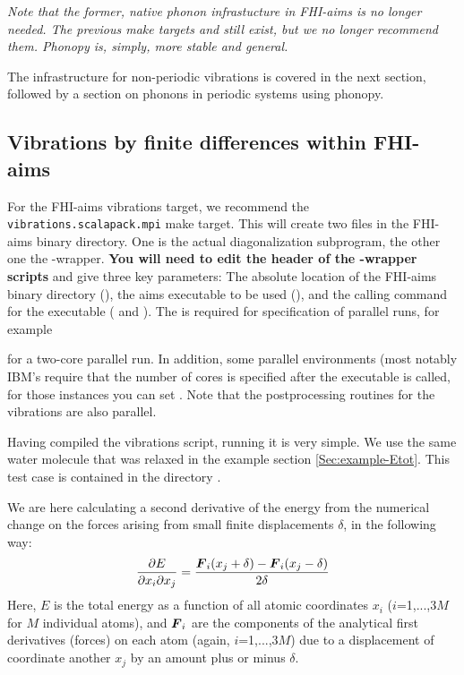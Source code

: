 \emph{Note that the former, native phonon infrastucture in FHI-aims is
  no longer needed. The previous make targets  and
     still exist, but we no longer recommend them.
    Phonopy is, simply, more stable and general.}

The infrastructure for non-periodic vibrations is covered in the next
section, followed by a section on phonons in periodic systems using
phonopy. 

\subsection*{Vibrations by finite differences within FHI-aims}

For the FHI-aims vibrations target, we recommend the
\texttt{vibrations.scalapack.mpi} make target. This will create two 
files in the FHI-aims binary directory. One is the actual
diagonalization subprogram, the other one the
-wrapper. \textbf{You will need to edit the header of the
  -wrapper scripts} and give three key parameters: The
absolute location of the FHI-aims binary directory
(), the aims executable to be used
(), and the calling command for the executable
( and ). The
 is required for specification of 
parallel runs, for example 


for a two-core parallel run. In addition, some parallel environments
(most notably IBM's  require that the number of cores is
specified after the executable is called, for those instances you can
set . Note that the postprocessing routines
for the vibrations are also parallel. 

Having compiled the vibrations script, running it is
very simple. We use the same water molecule that was relaxed in the example section
\ref{Sec:example-Etot}. This test case is
contained in the directory . 

We are here calculating a second derivative of the energy from the
numerical change on the forces arising from small finite
displacements $\delta$, in the following way:
\begin{equation}
  \frac{\partial E}{\partial x_i \partial x_j} = \frac{\mbox{\boldmath$F$}_i(x_j+\delta)-\mbox{\boldmath$F$}_i(x_j-\delta)}{2 \delta}
\end{equation}
Here, $E$ is the total energy as a function of all atomic coordinates
$x_i$ ($i$=1,...,3$M$ for $M$ individual atoms), and $\mbox{\boldmath$F$}_i$ are the
components of the analytical first derivatives (forces) on each atom
(again, $i$=1,...,3$M$) due to a displacement of coordinate another
$x_j$ by an amount plus or minus $\delta$. 

